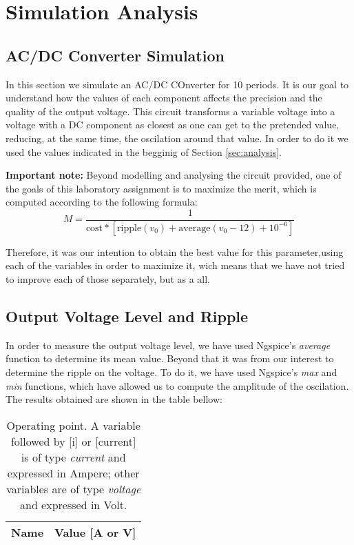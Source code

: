 \section{Simulation Analysis}
\label{sec:simulation}

\subsection{AC/DC Converter Simulation}
\label{subsec:circuit_simulation}
\par In this section we simulate an AC/DC COnverter for 10 periods. It is our goal to understand how the values of each component affects the precision and the quality of the output voltage. This circuit transforms a variable voltage into a voltage with a DC component as closest as one can get to the pretended value, reducing, at the same time, the oscilation around that value. In order to do it we used the values indicated in the begginig of Section \ref{sec:analysis}.

\par  \textbf{Important note:} Beyond modelling and analysing the circuit provided, one of the goals of this laboratory assignment is to maximize the merit, which is computed according to the following formula:
\begin{equation}
M = \frac{1}{\text{cost}*[\text{ripple}(v_0)+\text{average}(v_{0}-12)+10^{-6}]}
\end{equation}

Therefore, it was our intention to obtain the best value for this parameter,using each of the variables in order to maximize it, wich means that we have not tried to improve each of those separately, but as a all. 


\subsection{Output Voltage Level and Ripple}
\label{subsec:out_voltage}
In order to measure the output voltage level, we have used Ngspice's \textit{average} function to determine its mean value. Beyond that it was from our interest to determine the ripple on the voltage. To do it, we have used Ngspice's \textit{max} and \textit{min} functions, which have allowed us to compute the amplitude of the oscilation. The results obtained are shown in the table bellow:


\begin{table}[H]
  \centering
  \begin{tabular}{|l|r|}
    \hline    
    {\bf Name} & {\bf Value [A or V]} \\ \hline
    
  \end{tabular}
  \caption{Operating point. A variable followed by [i] or [current] is of type {\em current}
    and expressed in Ampere; other variables are of type {\it voltage} and expressed in
    Volt.}
  \label{tab:out_voltage}
\end{table}



